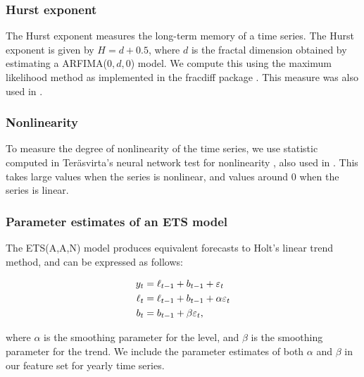 \documentclass[11pt,a4paper,]{article}
\theoremstyle{definition}
\theoremstyle{definition}
\theoremstyle{definition}
\theoremstyle{remark}
\begin{document}
\subsubsection*{Hurst exponent}\label{hurst-exponent}

The Hurst exponent measures the long-term memory of a time series. The
Hurst exponent is given by \(H=d+0.5\), where \(d\) is the fractal
dimension obtained by estimating a ARFIMA(\(0, d, 0\)) model. We compute
this using the maximum likelihood method \autocite{haslett1989space} as
implemented in the fracdiff package \autocite{fracdiff}. This measure
was also used in \textcite{wang2009rule}.

\subsubsection*{Nonlinearity}\label{nonlinearity}

To measure the degree of nonlinearity of the time series, we use
statistic computed in Teräsvirta's neural network test for nonlinearity
\autocite{nonlintest}, also used in \textcite{wang2009rule}. This takes
large values when the series is nonlinear, and values around 0 when the
series is linear.

\subsubsection*{Parameter estimates of an ETS
model}\label{parameter-estimates-of-an-ets-model}

The ETS(A,A,N) model \autocite{expsmooth08} produces equivalent
forecasts to Holt's linear trend method, and can be expressed as
follows:\vspace*{-.9cm}

\begin{align*}
  y_t    & = \ell_{t-1}+b_{t-1}+\varepsilon_t\\
  \ell_t & = \ell_{t-1}+b_{t-1}+\alpha \varepsilon_t\\
  b_t    & = b_{t-1}+\beta \varepsilon_t,\vspace*{-0.99cm}
\end{align*}

where \(\alpha\) is the smoothing parameter for the level, and \(\beta\)
is the smoothing parameter for the trend. We include the parameter
estimates of both \(\alpha\) and \(\beta\) in our feature set for yearly
time series.
\end{document}
